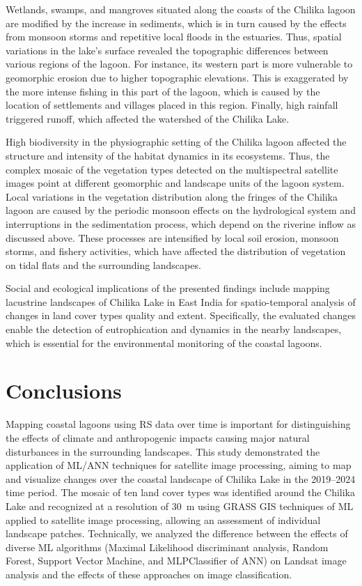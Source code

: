 \documentclass[jmse,article,accept,pdftex,oneauthor]{Definitions/mdpi}
\begin{document}
Wetlands, swamps, and mangroves situated along the coasts of the Chilika lagoon are modified by the increase in sediments, which is in turn caused by the effects from monsoon storms and repetitive local floods in the estuaries. Thus, spatial variations in the lake's surface revealed the topographic differences between various regions of the lagoon. For instance, its western part is more vulnerable to   geomorphic erosion due to   higher topographic elevations. This is exaggerated by the more intense fishing in this part of the lagoon, which is caused by the location of settlements and villages placed in this region. Finally, high rainfall triggered runoff, which affected the watershed of the Chilika Lake. 

High biodiversity in the physiographic setting of the Chilika lagoon affected the structure and intensity of the habitat dynamics in its ecosystems. Thus, the complex mosaic of the vegetation types detected on the multispectral satellite images point at different geomorphic and landscape units of the lagoon system. Local variations in the vegetation distribution along the fringes of the Chilika lagoon are caused by the periodic monsoon effects on the hydrological system and interruptions in the sedimentation process, which depend on the riverine inflow as discussed above. These processes are intensified by local soil erosion, monsoon storms, and fishery activities, which have affected the distribution of vegetation on tidal flats and the surrounding landscapes. 

Social and ecological implications of the presented findings include mapping lacustrine landscapes of Chilika Lake in East India for spatio-temporal analysis of changes in land cover types quality and extent. Specifically, the evaluated changes enable the detection of eutrophication and dynamics in the nearby landscapes, which is essential for the environmental monitoring of the coastal lagoons.

\section{Conclusions}

Mapping coastal lagoons using RS data over time is important for distinguishing the effects of climate and anthropogenic impacts causing major natural disturbances in the surrounding landscapes. This study demonstrated the application of ML/ANN techniques for satellite image processing, aiming to map and visualize changes over the coastal landscape of Chilika Lake in the 2019--2024 time period. The mosaic of ten land cover types was identified around the Chilika Lake and recognized at a resolution of 30~m using GRASS GIS techniques of ML applied to satellite image processing, allowing an assessment of individual landscape patches. Technically, we analyzed the difference between the effects of diverse ML algorithms (Maximal Likelihood discriminant analysis, Random Forest, Support Vector Machine, and MLPClassifier of ANN) on Landsat image analysis and the effects of these approaches on image classification. 
\end{document}
